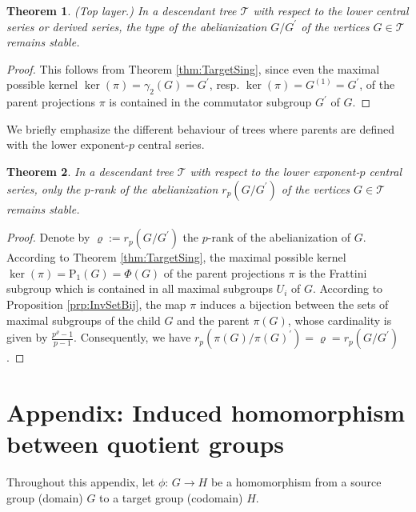 \documentclass{amsart}
\newtheorem{theorem}{Theorem}[section]
\theoremstyle{definition}
\numberwithin{equation}{section}
\begin{document}
\begin{theorem}
\label{thm:TypeAbLCAndDrvSer}
(Top layer.)
In a descendant tree \(\mathcal{T}\) with respect to the lower central series or derived series,
the type of the abelianization \(G/G^\prime\)
of the vertices \(G\in\mathcal{T}\) remains stable.
\end{theorem}

\begin{proof}
This follows from Theorem
\ref{thm:TargetSing},
since even the maximal possible kernel \(\ker(\pi)=\gamma_2(G)=G^\prime\),
resp. \(\ker(\pi)=G^{(1)}=G^\prime\),
of the parent projections \(\pi\)
is contained in the commutator subgroup \(G^\prime\) of \(G\).
\end{proof}


\noindent
We briefly emphasize the different behaviour of trees where parents are defined
with the lower exponent-\(p\) central series.

\begin{theorem}
\label{thm:RankAbLpCSer}
In a descendant tree \(\mathcal{T}\) with respect to the lower exponent-\(p\) central series,
only the \(p\)-rank of the abelianization \(r_p(G/G^\prime)\)
of the vertices \(G\in\mathcal{T}\) remains stable.
\end{theorem}

\begin{proof}
Denote by \(\varrho:=r_p(G/G^\prime)\) the \(p\)-rank of the abelianization of \(G\).
According to Theorem
\ref{thm:TargetSing},
the maximal possible kernel \(\ker(\pi)=\mathrm{P}_1(G)=\Phi(G)\)
of the parent projections \(\pi\)
is the Frattini subgroup which is contained in all maximal subgroups \(U_i\) of \(G\).
According to Proposition
\ref{prp:InvSetBij},
the map \(\pi\) induces a bijection between the sets of maximal subgroups
of the child \(G\) and the parent \(\pi(G)\),
whose cardinality is given by \(\frac{p^{\varrho}-1}{p-1}\).
Consequently, we have \(r_p(\pi(G)/\pi(G)^\prime)=\varrho=r_p(G/G^\prime)\).
\end{proof}



\section{Appendix: Induced homomorphism between quotient groups}
\label{s:HomSngSbg}

\noindent
Throughout this appendix, let \(\phi:\,G\to H\) be a homomorphism
from a source group (domain) \(G\) to a target group (codomain) \(H\).
\end{document}

